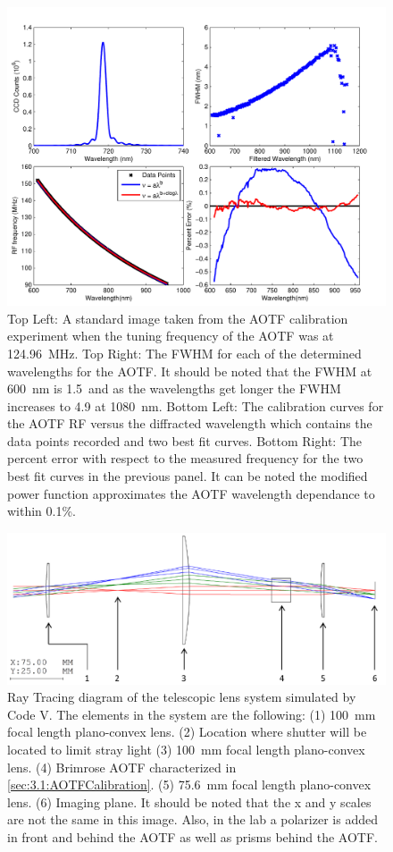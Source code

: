 \documentclass[12pt]{article}
\begin{document}
\begin{figure}[h!]
    \includegraphics[width=1.0\textwidth]{./Images/3-1-AOTFCharaterization.pdf}
    \caption[Characterization Curves for the Brimrose AOTF]{Top Left: A standard image taken from the AOTF calibration experiment when the tuning frequency of the AOTF was at 124.96~MHz. Top Right: The FWHM for each of the determined wavelengths for the AOTF. It should be noted that the FWHM at 600~nm is 1.5~and as the wavelengths get longer the FWHM increases to 4.9 at 1080~nm. Bottom Left: The calibration curves for the AOTF RF versus the  diffracted wavelength which contains the data points recorded and two best fit curves. Bottom Right: The percent error with respect to the measured frequency for the two best fit curves in the previous panel. It can be noted the modified power function approximates the AOTF wavelength dependance to within 0.1\%.}
    \label{fig:3.1:AOTFCharaterization}
\end{figure}

\begin{figure}[h!]
    \includegraphics[width=1.0\textwidth]{./Images/3-2-TelescopicRayTracing.pdf}
    \caption[ALI Telescopic Design Prototype]{Ray Tracing diagram of the telescopic lens system simulated by Code V. The elements in the system are the following: (1) 100~mm focal length plano-convex lens. (2) Location where shutter will be located to limit stray light (3) 100~mm focal length plano-convex lens. (4) Brimrose AOTF characterized in \autoref{sec:3.1:AOTFCalibration}. (5) 75.6~mm focal length plano-convex lens. (6) Imaging plane. It should be noted that the x and y scales are not the same in this image. Also, in the lab a polarizer is added in front and behind the AOTF as well as prisms behind the AOTF.}
    \label{fig:3.2:telescopicRayTracing}
\end{figure}
\end{document}
